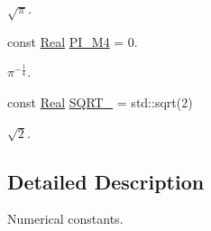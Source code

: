 \begin{DoxyCompactItemize}
\begin{DoxyCompactList}\small\item\em $ \sqrt{\pi} $. \end{DoxyCompactList}\item 
\hypertarget{namespaceconstants_a3b733bd721f65dc9124f4fb15af3da5c}{const \hyperlink{typedefs_8h_a060b837c3b4486ee35317744156f3da2}{Real} \hyperlink{namespaceconstants_a3b733bd721f65dc9124f4fb15af3da5c}{P\-I\-\_\-\-M4} = 0.}\label{namespaceconstants_a3b733bd721f65dc9124f4fb15af3da5c}

\begin{DoxyCompactList}\small\item\em $ \pi^{-\frac{1}{4}} $. \end{DoxyCompactList}\item 
\hypertarget{namespaceconstants_ab0c53d0b9c422d694073f97eb185d292}{const \hyperlink{typedefs_8h_a060b837c3b4486ee35317744156f3da2}{Real} \hyperlink{namespaceconstants_ab0c53d0b9c422d694073f97eb185d292}{S\-Q\-R\-T\-\_} = std\-::sqrt(2)}\label{namespaceconstants_ab0c53d0b9c422d694073f97eb185d292}

\begin{DoxyCompactList}\small\item\em $ \sqrt{2} $. \end{DoxyCompactList}\end{DoxyCompactItemize}


\subsection{Detailed Description}
Numerical constants. 